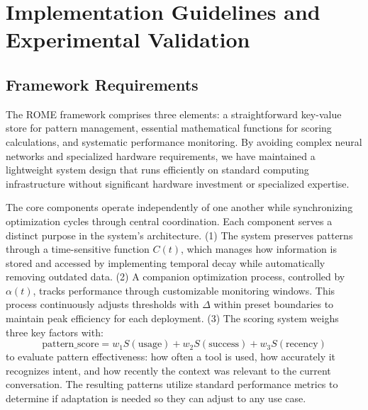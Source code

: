 \documentclass[12pt]{article}
\begin{document}
\section{Implementation Guidelines and Experimental Validation}

\subsection{Framework Requirements}
The ROME framework comprises three elements: a straightforward key-value store for pattern management, essential mathematical functions for scoring calculations, and systematic performance monitoring. By avoiding complex neural networks and specialized hardware requirements, we have maintained a lightweight system design that runs efficiently on standard computing infrastructure without significant hardware investment or specialized expertise.

The core components operate independently of one another while synchronizing optimization cycles through central coordination. Each component serves a distinct purpose in the system's architecture. (1) The system preserves patterns through a time-sensitive function $C(t)$, which manages how information is stored and accessed by implementing temporal decay while automatically removing outdated data. (2) A companion optimization process, controlled by $\alpha(t)$, tracks performance through customizable monitoring windows. This process continuously adjusts thresholds with $\Delta$ within preset boundaries to maintain peak efficiency for each deployment. (3) The scoring system weighs three key factors with:
$$\text{pattern\_score} = w_1S(\text{usage}) + w_2S(\text{success}) + w_3S(\text{recency})$$
to evaluate pattern effectiveness: how often a tool is used, how accurately it recognizes intent, and how recently the context was relevant to the current conversation. The resulting patterns utilize standard performance metrics to determine if adaptation is needed so they can adjust to any use case.
\end{document}
